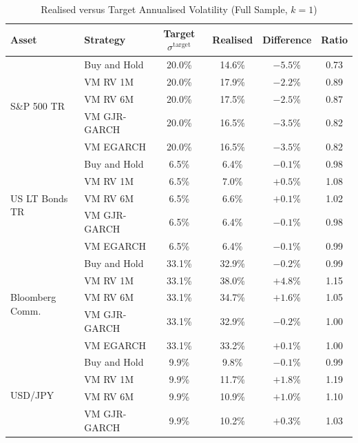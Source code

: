 \documentclass[12pt, a4paper]{article}
\newcommand{\stgt}{\sigma^{\mathrm{target}}}
\begin{document}
\begin{table}[H]
  \centering
  \caption{Realised versus Target Annualised Volatility (Full Sample, $k = 1$)}
  \label{tab:realised_target}
  \footnotesize
  \begin{tabular}{llcccc}
    \toprule
    \textbf{Asset} & \textbf{Strategy}
                   & \textbf{Target $\stgt$} & \textbf{Realised}
                   & \textbf{Difference} & \textbf{Ratio} \\
    \midrule
    \multirow{5}{*}{S\&P 500 TR}
      & Buy and Hold     & 20.0\% & 14.6\% & $-5.5$\% & 0.73 \\
      & VM RV 1M         & 20.0\% & 17.9\% & $-2.2$\% & 0.89 \\
      & VM RV 6M         & 20.0\% & 17.5\% & $-2.5$\% & 0.87 \\
      & VM GJR-GARCH     & 20.0\% & 16.5\% & $-3.5$\% & 0.82 \\
      & VM EGARCH        & 20.0\% & 16.5\% & $-3.5$\% & 0.82 \\
    \midrule
    \multirow{5}{*}{US LT Bonds TR}
      & Buy and Hold     &  6.5\% &  6.4\% & $-0.1$\% & 0.98 \\
      & VM RV 1M         &  6.5\% &  7.0\% & $+0.5$\% & 1.08 \\
      & VM RV 6M         &  6.5\% &  6.6\% & $+0.1$\% & 1.02 \\
      & VM GJR-GARCH     &  6.5\% &  6.4\% & $-0.1$\% & 0.98 \\
      & VM EGARCH        &  6.5\% &  6.4\% & $-0.1$\% & 0.99 \\
    \midrule
    \multirow{5}{*}{Bloomberg Comm.}
      & Buy and Hold     & 33.1\% & 32.9\% & $-0.2$\% & 0.99 \\
      & VM RV 1M         & 33.1\% & 38.0\% & $+4.8$\% & 1.15 \\
      & VM RV 6M         & 33.1\% & 34.7\% & $+1.6$\% & 1.05 \\
      & VM GJR-GARCH     & 33.1\% & 32.9\% & $-0.2$\% & 1.00 \\
      & VM EGARCH        & 33.1\% & 33.2\% & $+0.1$\% & 1.00 \\
    \midrule
    \multirow{5}{*}{USD/JPY}
      & Buy and Hold     &  9.9\% &  9.8\% & $-0.1$\% & 0.99 \\
      & VM RV 1M         &  9.9\% & 11.7\% & $+1.8$\% & 1.19 \\
      & VM RV 6M         &  9.9\% & 10.9\% & $+1.0$\% & 1.10 \\
      & VM GJR-GARCH     &  9.9\% & 10.2\% & $+0.3$\% & 1.03 \\

\end{tabular}
\end{table}
\end{document}
